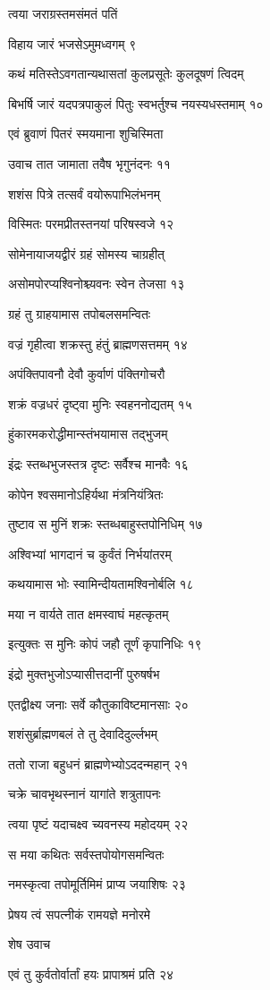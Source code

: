त्वया जराग्रस्तमसंमतं पतिं

विहाय जारं भजसेऽमुमध्वगम् ९

कथं मतिस्तेऽवगतान्यथासतां कुलप्रसूतेः कुलदूषणं त्विदम्

बिभर्षि जारं यदपत्रपाकुलं पितुः स्वभर्तुश्च नयस्यधस्तमाम् १०

एवं ब्रुवाणं पितरं स्मयमाना शुचिस्मिता

उवाच तात जामाता तवैष भृगुनंदनः ११

शशंस पित्रे तत्सर्वं वयोरूपाभिलंभनम्

विस्मितः परमप्रीतस्तनयां परिषस्वजे १२

सोमेनायाजयद्वीरं ग्रहं सोमस्य चाग्रहीत्

असोमपोरप्यश्विनोश्च्यवनः स्वेन तेजसा १३

ग्रहं तु ग्राहयामास तपोबलसमन्वितः

वज्रं गृहीत्वा शक्रस्तु हंतुं ब्राह्मणसत्तमम् १४

अपंक्तिपावनौ देवौ कुर्वाणं पंक्तिगोचरौ

शक्रं वज्रधरं दृष्ट्वा मुनिः स्वहननोद्यतम् १५

हुंकारमकरोद्धीमान्स्तंभयामास तद्भुजम्

इंद्रः स्तब्धभुजस्तत्र दृष्टः सर्वैश्च मानवैः १६

कोपेन श्वसमानोऽहिर्यथा मंत्रनियंत्रितः

तुष्टाव स मुनिं शक्रः स्तब्धबाहुस्तपोनिधिम् १७

अश्विभ्यां भागदानं च कुर्वंतं निर्भयांतरम्

कथयामास भोः स्वामिन्दीयतामश्विनोर्बलि १८

मया न वार्यते तात क्षमस्वाघं महत्कृतम्

इत्युक्तः स मुनिः कोपं जहौ तूर्णं कृपानिधिः १९

इंद्रो मुक्तभुजोऽप्यासीत्तदानीं पुरुषर्षभ

एतद्वीक्ष्य जनाः सर्वे कौतुकाविष्टमानसाः २०

शशंसुर्ब्राह्मणबलं ते तु देवादिदुर्ल्लभम्

ततो राजा बहुधनं ब्राह्मणेभ्योऽददन्महान् २१

चक्रे चावभृथस्नानं यागांते शत्रुतापनः

त्वया पृष्टं यदाचक्ष्व च्यवनस्य महोदयम् २२

स मया कथितः सर्वस्तपोयोगसमन्वितः

नमस्कृत्वा तपोमूर्तिमिमं प्राप्य जयाशिषः २३

प्रेषय त्वं सपत्नीकं रामयज्ञे मनोरमे

शेष उवाच

एवं तु कुर्वतोर्वार्तां हयः प्रापाश्रमं प्रति २४


